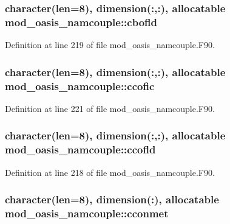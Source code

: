 \hypertarget{classmod__oasis__namcouple_ab0f93bb917e445dc4e55fc2326168a42}{
\subsubsection[{cbofld}]{\setlength{\rightskip}{0pt plus 5cm}character(len=8), dimension(\+:,\+:), allocatable mod\+\_\+oasis\+\_\+namcouple\+::cbofld\hspace{0.3cm}{\ttfamily [private]}}}\label{classmod__oasis__namcouple_ab0f93bb917e445dc4e55fc2326168a42}


Definition at line 219 of file mod\+\_\+oasis\+\_\+namcouple.\+F90.

\hypertarget{classmod__oasis__namcouple_a009543dda4495ab9b5ac3fcf15767682}{
\subsubsection[{ccofic}]{\setlength{\rightskip}{0pt plus 5cm}character(len=8), dimension(\+:,\+:), allocatable mod\+\_\+oasis\+\_\+namcouple\+::ccofic\hspace{0.3cm}{\ttfamily [private]}}}\label{classmod__oasis__namcouple_a009543dda4495ab9b5ac3fcf15767682}


Definition at line 221 of file mod\+\_\+oasis\+\_\+namcouple.\+F90.

\hypertarget{classmod__oasis__namcouple_af8d81a53bd28ddf6bfe19f5e05f1d867}{
\subsubsection[{ccofld}]{\setlength{\rightskip}{0pt plus 5cm}character(len=8), dimension(\+:,\+:), allocatable mod\+\_\+oasis\+\_\+namcouple\+::ccofld\hspace{0.3cm}{\ttfamily [private]}}}\label{classmod__oasis__namcouple_af8d81a53bd28ddf6bfe19f5e05f1d867}


Definition at line 218 of file mod\+\_\+oasis\+\_\+namcouple.\+F90.

\hypertarget{classmod__oasis__namcouple_a535fadd17426c228698e3a51fd54b605}{
\subsubsection[{cconmet}]{\setlength{\rightskip}{0pt plus 5cm}character(len=8), dimension(\+:), allocatable mod\+\_\+oasis\+\_\+namcouple\+::cconmet\hspace{0.3cm}{\ttfamily [private]}}}\label{classmod__oasis__namcouple_a535fadd17426c228698e3a51fd54b605}


